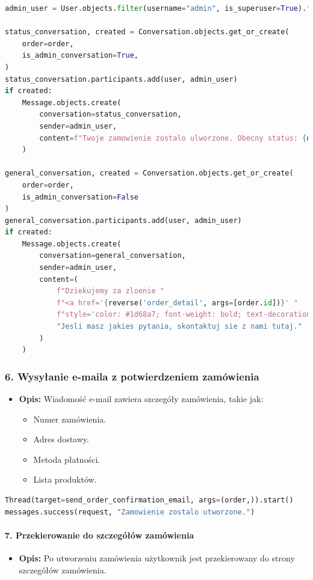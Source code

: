 \documentclass[12pt,a4paper,oneside]{article}
\theoremstyle{definition}
\numberwithin{equation}{section}
\begin{document}
\begin{lstlisting}[language=Python]
admin_user = User.objects.filter(username="admin", is_superuser=True).first()

status_conversation, created = Conversation.objects.get_or_create(
    order=order,
    is_admin_conversation=True,
)
status_conversation.participants.add(user, admin_user)
if created:
    Message.objects.create(
        conversation=status_conversation,
        sender=admin_user,
        content=f"Twoje zamowienie zostalo ulworzone. Obecny status: {order.get_status_display()}."
    )

general_conversation, created = Conversation.objects.get_or_create(
    order=order,
    is_admin_conversation=False
)
general_conversation.participants.add(user, admin_user)
if created:
    Message.objects.create(
        conversation=general_conversation,
        sender=admin_user,
        content=(
            f"Dziekujemy za zloenie "
            f"<a href='{reverse('order_detail', args=[order.id])}' "
            f"style='color: #1d68a7; font-weight: bold; text-decoration: underline;'>zamowienia #{order.id}</a>! "
            "Jesli masz jakies pytania, skontaktuj sie z nami tutaj."
        )
    )
\end{lstlisting}


\subsubsection*{6. Wysyłanie e-maila z potwierdzeniem zamówienia}
\begin{itemize}
    \item \textbf{Opis:} Wiadomość e-mail zawiera szczegóły zamówienia, takie jak:
    \begin{itemize}
        \item Numer zamówienia.
        \item Adres dostawy.
        \item Metoda płatności.
        \item Lista produktów.
    \end{itemize}
\end{itemize}

\begin{lstlisting}[language=Python]
Thread(target=send_order_confirmation_email, args=(order,)).start()
messages.success(request, "Zamowienie zostalo utworzone.")
\end{lstlisting}



\paragraph{7. Przekierowanie do szczegółów zamówienia}
\begin{itemize}
    \item \textbf{Opis:} Po utworzeniu zamówienia użytkownik jest przekierowany do strony szczegółów zamówienia.
\end{itemize}
\end{document}
